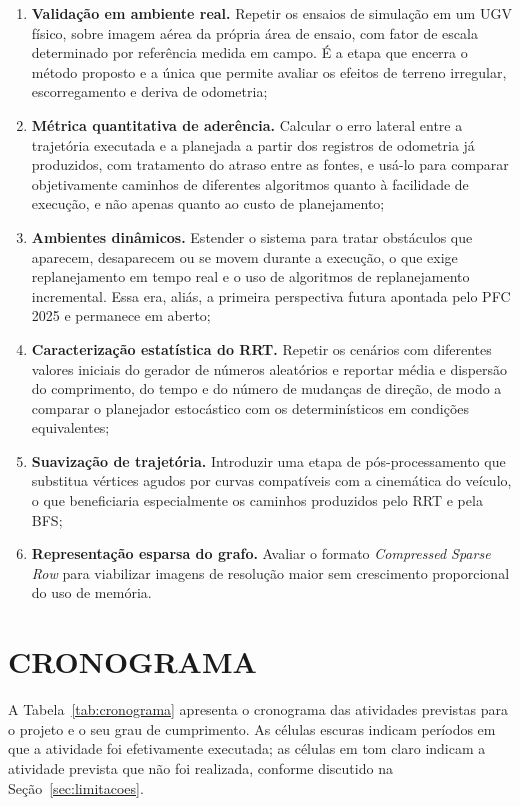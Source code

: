 \documentclass[
    12pt,
    openright,
    oneside,
    a4paper,
    english,
    brazil
]{abntex2}
\begin{document}
\begin{enumerate}
    \item \textbf{Validação em ambiente real.} Repetir os ensaios de simulação em um UGV físico, sobre imagem aérea da própria área de ensaio, com fator de escala determinado por referência medida em campo. É a etapa que encerra o método proposto e a única que permite avaliar os efeitos de terreno irregular, escorregamento e deriva de odometria;
    \item \textbf{Métrica quantitativa de aderência.} Calcular o erro lateral entre a trajetória executada e a planejada a partir dos registros de odometria já produzidos, com tratamento do atraso entre as fontes, e usá-lo para comparar objetivamente caminhos de diferentes algoritmos quanto à facilidade de execução, e não apenas quanto ao custo de planejamento;
    \item \textbf{Ambientes dinâmicos.} Estender o sistema para tratar obstáculos que aparecem, desaparecem ou se movem durante a execução, o que exige replanejamento em tempo real e o uso de algoritmos de replanejamento incremental. Essa era, aliás, a primeira perspectiva futura apontada pelo PFC 2025 e permanece em aberto;
    \item \textbf{Caracterização estatística do RRT.} Repetir os cenários com diferentes valores iniciais do gerador de números aleatórios e reportar média e dispersão do comprimento, do tempo e do número de mudanças de direção, de modo a comparar o planejador estocástico com os determinísticos em condições equivalentes;
    \item \textbf{Suavização de trajetória.} Introduzir uma etapa de pós-processamento que substitua vértices agudos por curvas compatíveis com a cinemática do veículo, o que beneficiaria especialmente os caminhos produzidos pelo RRT e pela BFS;
    \item \textbf{Representação esparsa do grafo.} Avaliar o formato \textit{Compressed Sparse Row} \cite{saad2003} para viabilizar imagens de resolução maior sem crescimento proporcional do uso de memória.
\end{enumerate}

\chapter{CRONOGRAMA}

A Tabela~\ref{tab:cronograma} apresenta o cronograma das atividades previstas para o projeto e o seu grau de cumprimento. As células escuras indicam períodos em que a atividade foi efetivamente executada; as células em tom claro indicam a atividade prevista que não foi realizada, conforme discutido na Seção~\ref{sec:limitacoes}.
\end{document}
